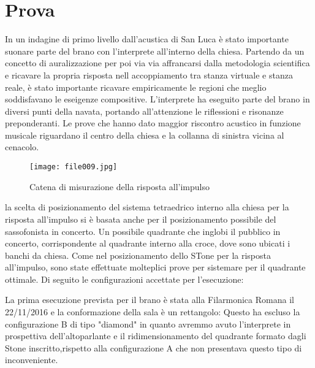\section{Prova}

In un indagine di primo livello dall'acustica di San Luca è stato importante suonare
parte del brano con l'interprete all'interno della chiesa. Partendo da un concetto
di auralizzazione per poi via via affrancarsi dalla metodologia scientifica e ricavare
la propria risposta nell accoppiamento tra stanza virtuale e stanza reale, è stato
importante ricavare empiricamente le regioni che meglio soddisfavano le eseigenze
compositive. L'interprete ha eseguito parte del brano in diversi punti della navata,
portando all'attenzione le riflessioni e risonanze preponderanti. 
Le prove che hanno dato maggior riscontro acustico in funzione musicale riguardano
il centro della chiesa e la collanna di sinistra vicina al cenacolo.

\begin{figure}
\centering
{\texttt{[image: file009.jpg]}}
\caption[Pianta S. Luca]{Catena di misurazione della risposta all'impulso}
\label{fig:tetratetra}
\end{figure}

la scelta di posizionamento del sistema tetraedrico interno alla chiesa per la
risposta all'impulso si è basata anche per il posizionamento possibile del sassofonista
in concerto.
Un possibile quadrante che inglobi il pubblico in concerto, corrispondente al
quadrante interno alla croce, dove sono ubicati i banchi da chiesa.
Come nel posizionamento dello STone per la risposta all'impulso, sono state
effettuate molteplici prove per sistemare per il quadrante ottimale. Di seguito
le configurazioni accettate per l'esecuzione:

\begin{figure}[h]
\centering
{} \quad
{}
\end{figure}

La prima esecuzione prevista per il brano è stata alla Filarmonica Romana il
22/11/2016 e la conformazione della sala è un rettangolo: Questo ha escluso
la configurazione B di tipo "diamond" in quanto avremmo avuto l'interprete in
prospettiva dell'altoparlante e il ridimensionamento del quadrante formato dagli
Stone inscritto,rispetto alla configurazione A che non presentava questo tipo di inconveniente.

